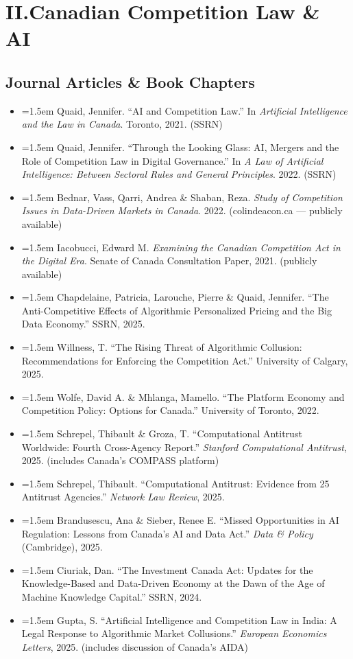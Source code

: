 \documentclass[12pt, letterpaper]{article}
\newcommand{\entry}[1]{%
  \item \hangindent=1.5em \hangafter=1 #1%
}
\begin{document}
\section{II.\quad Canadian Competition Law \& AI}

\subsection{Journal Articles \& Book Chapters}

\begin{itemize}
\entry{Quaid, Jennifer. ``AI and Competition Law.'' In \textit{Artificial Intelligence and the Law in Canada}. Toronto, 2021. (SSRN)}
\entry{Quaid, Jennifer. ``Through the Looking Glass: AI, Mergers and the Role of Competition Law in Digital Governance.'' In \textit{A Law of Artificial Intelligence: Between Sectoral Rules and General Principles}. 2022. (SSRN)}
\entry{Bednar, Vass, Qarri, Andrea \& Shaban, Reza. \textit{Study of Competition Issues in Data-Driven Markets in Canada}. 2022. (colindeacon.ca --- publicly available)}
\entry{Iacobucci, Edward M. \textit{Examining the Canadian Competition Act in the Digital Era}. Senate of Canada Consultation Paper, 2021. (publicly available)}
\entry{Chapdelaine, Patricia, Larouche, Pierre \& Quaid, Jennifer. ``The Anti-Competitive Effects of Algorithmic Personalized Pricing and the Big Data Economy.'' SSRN, 2025.}
\entry{Willness, T. ``The Rising Threat of Algorithmic Collusion: Recommendations for Enforcing the Competition Act.'' University of Calgary, 2025.}
\entry{Wolfe, David A. \& Mhlanga, Mamello. ``The Platform Economy and Competition Policy: Options for Canada.'' University of Toronto, 2022.}
\entry{Schrepel, Thibault \& Groza, T. ``Computational Antitrust Worldwide: Fourth Cross-Agency Report.'' \textit{Stanford Computational Antitrust}, 2025. (includes Canada's COMPASS platform)}
\entry{Schrepel, Thibault. ``Computational Antitrust: Evidence from 25 Antitrust Agencies.'' \textit{Network Law Review}, 2025.}
\entry{Brandusescu, Ana \& Sieber, Renee E. ``Missed Opportunities in AI Regulation: Lessons from Canada's AI and Data Act.'' \textit{Data \& Policy} (Cambridge), 2025.}
\entry{Ciuriak, Dan. ``The Investment Canada Act: Updates for the Knowledge-Based and Data-Driven Economy at the Dawn of the Age of Machine Knowledge Capital.'' SSRN, 2024.}
\entry{Gupta, S. ``Artificial Intelligence and Competition Law in India: A Legal Response to Algorithmic Market Collusions.'' \textit{European Economics Letters}, 2025. (includes discussion of Canada's AIDA)}
\end{itemize}
\end{document}
